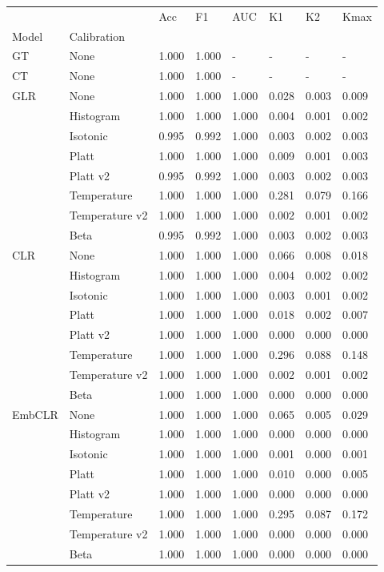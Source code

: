 \begin{tabular}{llllllll}
\toprule
 &  & Acc & F1 & AUC & K1 & K2 & Kmax \\
Model & Calibration &  &  &  &  &  &  \\
\midrule
GT & None & 1.000 & 1.000 & - & - & - & - \\
\cline{1-8}
CT & None & 1.000 & 1.000 & - & - & - & - \\
\cline{1-8}
\multirow[t]{8}{*}{GLR} & None & 1.000 & 1.000 & 1.000 & 0.028 & 0.003 & 0.009 \\
 & Histogram & 1.000 & 1.000 & 1.000 & 0.004 & 0.001 & 0.002 \\
 & Isotonic & 0.995 & 0.992 & 1.000 & 0.003 & 0.002 & 0.003 \\
 & Platt & 1.000 & 1.000 & 1.000 & 0.009 & 0.001 & 0.003 \\
 & Platt v2 & 0.995 & 0.992 & 1.000 & 0.003 & 0.002 & 0.003 \\
 & Temperature & 1.000 & 1.000 & 1.000 & 0.281 & 0.079 & 0.166 \\
 & Temperature v2 & 1.000 & 1.000 & 1.000 & 0.002 & 0.001 & 0.002 \\
 & Beta & 0.995 & 0.992 & 1.000 & 0.003 & 0.002 & 0.003 \\
\cline{1-8}
\multirow[t]{8}{*}{CLR} & None & 1.000 & 1.000 & 1.000 & 0.066 & 0.008 & 0.018 \\
 & Histogram & 1.000 & 1.000 & 1.000 & 0.004 & 0.002 & 0.002 \\
 & Isotonic & 1.000 & 1.000 & 1.000 & 0.003 & 0.001 & 0.002 \\
 & Platt & 1.000 & 1.000 & 1.000 & 0.018 & 0.002 & 0.007 \\
 & Platt v2 & 1.000 & 1.000 & 1.000 & 0.000 & 0.000 & 0.000 \\
 & Temperature & 1.000 & 1.000 & 1.000 & 0.296 & 0.088 & 0.148 \\
 & Temperature v2 & 1.000 & 1.000 & 1.000 & 0.002 & 0.001 & 0.002 \\
 & Beta & 1.000 & 1.000 & 1.000 & 0.000 & 0.000 & 0.000 \\
\cline{1-8}
\multirow[t]{8}{*}{EmbCLR} & None & 1.000 & 1.000 & 1.000 & 0.065 & 0.005 & 0.029 \\
 & Histogram & 1.000 & 1.000 & 1.000 & 0.000 & 0.000 & 0.000 \\
 & Isotonic & 1.000 & 1.000 & 1.000 & 0.001 & 0.000 & 0.001 \\
 & Platt & 1.000 & 1.000 & 1.000 & 0.010 & 0.000 & 0.005 \\
 & Platt v2 & 1.000 & 1.000 & 1.000 & 0.000 & 0.000 & 0.000 \\
 & Temperature & 1.000 & 1.000 & 1.000 & 0.295 & 0.087 & 0.172 \\
 & Temperature v2 & 1.000 & 1.000 & 1.000 & 0.000 & 0.000 & 0.000 \\
 & Beta & 1.000 & 1.000 & 1.000 & 0.000 & 0.000 & 0.000 \\
\cline{1-8}
\bottomrule
\end{tabular}
